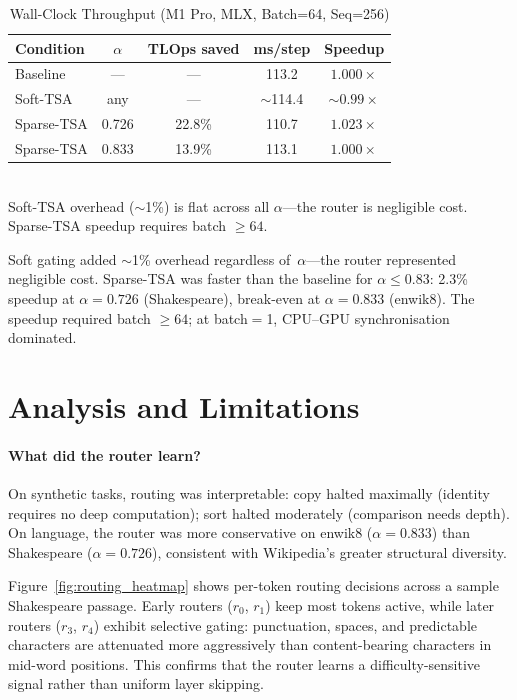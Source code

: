 \documentclass{article}
\begin{document}
\begin{table}[h]
\centering
\caption{Wall-Clock Throughput (M1 Pro, MLX, Batch=64, Seq=256)}
\label{tab:wallclock}
\small
\begin{tabular}{lcccc}
\toprule
Condition & $\alpha$ & TLOps saved & ms/step & Speedup \\
\midrule
Baseline        & ---   & ---    & 113.2 & $1.000\times$ \\
Soft-TSA        & any   & ---    & $\sim$114.4 & $\sim$$0.99\times$ \\
Sparse-TSA      & 0.726 & 22.8\% & 110.7 & $\mathbf{1.023\times}$ \\
Sparse-TSA      & 0.833 & 13.9\% & 113.1 & $1.000\times$ \\
\bottomrule
\end{tabular}
\\[3pt]
{\footnotesize Soft-TSA overhead ($\sim$1\%) is flat across all $\alpha$---the router
is negligible cost. Sparse-TSA speedup requires batch $\geq 64$.}
\end{table}

Soft gating added $\sim$1\% overhead regardless of~$\alpha$---the router
represented negligible cost. Sparse-TSA was faster than the baseline for
$\alpha \leq 0.83$: 2.3\% speedup at $\alpha{=}0.726$ (Shakespeare), break-even at
$\alpha{=}0.833$ (enwik8). The speedup required batch $\geq 64$; at batch$=$1,
CPU--GPU synchronisation dominated.

\section{Analysis and Limitations}

\paragraph{What did the router learn?}
On synthetic tasks, routing was interpretable: copy halted maximally (identity
requires no deep computation); sort halted moderately (comparison needs depth).
On language, the router was more conservative on enwik8 ($\alpha = 0.833$)
than Shakespeare ($\alpha = 0.726$), consistent with Wikipedia's greater
structural diversity.

Figure~\ref{fig:routing_heatmap} shows per-token routing decisions across a
sample Shakespeare passage. Early routers ($r_0$, $r_1$) keep most tokens
active, while later routers ($r_3$, $r_4$) exhibit selective gating:
punctuation, spaces, and predictable characters are attenuated more
aggressively than content-bearing characters in mid-word positions. This
confirms that the router learns a difficulty-sensitive signal rather than
uniform layer skipping.
\end{document}
